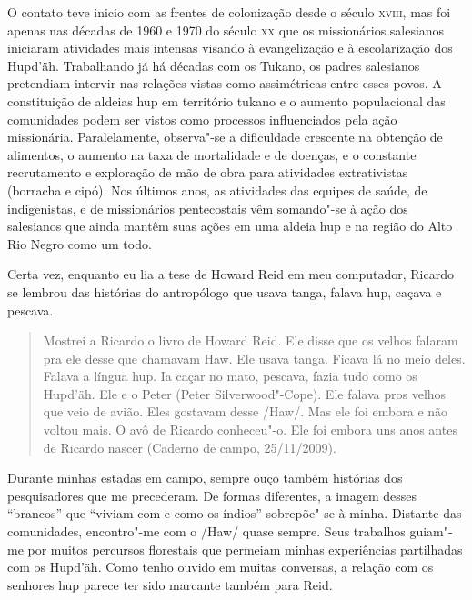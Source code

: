 O contato teve inicio com as frentes de colonização desde o século
\textsc{xviii}, mas foi apenas nas décadas de 1960 e 1970 do século \textsc{xx} que os
missionários salesianos iniciaram atividades mais intensas visando à
evangelização e à escolarização dos Hupd'äh. Trabalhando já há décadas
com os Tukano, os padres salesianos pretendiam intervir nas relações
vistas como assimétricas entre esses povos. A constituição de aldeias
hup em território tukano e o aumento populacional das comunidades podem
ser vistos como processos influenciados pela ação missionária.
Paralelamente, observa"-se a dificuldade crescente na obtenção de
alimentos, o aumento na taxa de mortalidade e de doenças, e o constante
recrutamento e exploração de mão de obra para atividades extrativistas
(borracha e cipó). Nos últimos anos, as atividades das equipes de saúde,
de indigenistas, e de missionários pentecostais vêm somando"-se à ação
dos salesianos que ainda mantêm suas ações em uma aldeia hup e na região
do Alto Rio Negro como um todo.

\asterisc{}  

Certa vez, enquanto eu lia a tese de Howard Reid em meu computador,
Ricardo se lembrou das histórias do antropólogo que usava tanga, falava
hup, caçava e pescava.

\begin{quote}
Mostrei a Ricardo o livro de Howard Reid. Ele disse que os velhos
falaram pra ele desse que chamavam Haw. Ele usava tanga. Ficava lá no
meio deles. Falava a língua hup. Ia caçar no mato, pescava, fazia tudo
como os Hupd'äh. Ele e o Peter (Peter Silverwood"-Cope). Ele falava pros
velhos que veio de avião. Eles gostavam desse /Haw/. Mas ele foi embora
e não voltou mais. O avô de Ricardo conheceu"-o. Ele foi embora uns anos
antes de Ricardo nascer (Caderno de campo, 25/11/2009).
\end{quote}

Durante minhas estadas em campo, sempre ouço também histórias dos
pesquisadores que me precederam. De formas diferentes, a imagem desses
``brancos'' que ``viviam com e como os índios'' sobrepõe"-se à minha.
Distante das comunidades, encontro"-me com o /Haw/ quase sempre. Seus
trabalhos guiam"-me por muitos percursos florestais que permeiam minhas
experiências partilhadas com os Hupd'äh. Como tenho ouvido em muitas
conversas, a relação com os senhores hup parece ter sido marcante também
para Reid.

